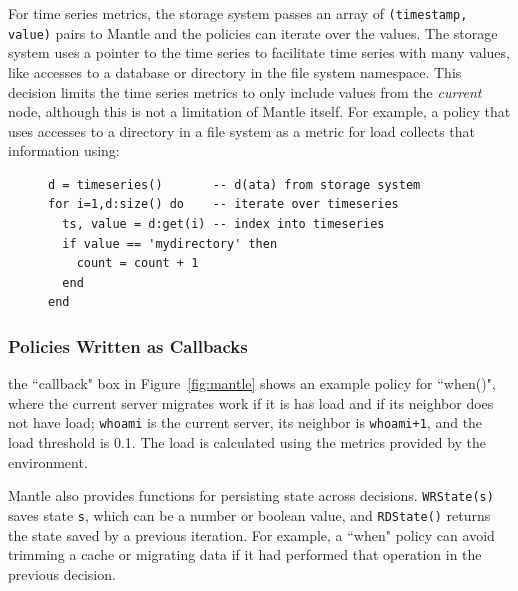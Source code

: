 For time series metrics, the storage system passes an array of \texttt{(timestamp,
value)} pairs to Mantle and the policies can iterate over the values. The
storage system uses a pointer to the time series to facilitate time series with many
values, like accesses to a database or directory in the file system namespace.
This decision limits the time series metrics to only include values from the
{\it current} node, although this is not a limitation of Mantle itself.  For
example, a policy that uses accesses to a directory in a file system as a
metric for load collects that information using:

\begin{figure}[h]
\footnotesize
\begin{verbatim}
d = timeseries()       -- d(ata) from storage system
for i=1,d:size() do    -- iterate over timeseries
  ts, value = d:get(i) -- index into timeseries 
  if value == 'mydirectory' then
    count = count + 1
  end
end
\end{verbatim}
\end{figure}



\subsubsection{Policies Written as Callbacks} the ``callback" box in
Figure~\ref{fig:mantle} shows an example policy for ``when()", where the
current server migrates work if it is has load and if its neighbor does not
have load; \texttt{whoami} is the current server, its neighbor is
\texttt{whoami+1}, and the load threshold is 0.1. The load is calculated using
the metrics provided by the environment.

Mantle also provides functions for persisting state across decisions.
\texttt{WRState(s)} saves state \texttt{s}, which can be a number or boolean
value, and \texttt{RDState()} returns the state saved by a previous iteration.
For example, a ``when" policy can avoid trimming a cache or migrating data if
it had performed that operation in the previous decision.



